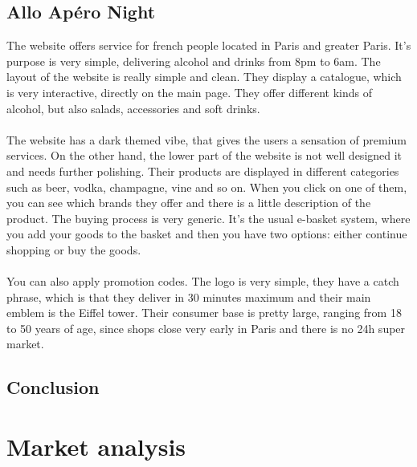 \documentclass[12p]{article}
\begin{document}
\subsection{Allo Apéro Night \cite{alloAperoNight}}
The website offers service for french people located in Paris and greater Paris.
It’s purpose is very simple, delivering alcohol and drinks from 8pm to 6am.
The layout of the website is really simple and clean. They display a catalogue, which is very interactive, directly on the main page. They offer different kinds of alcohol, but also salads, accessories and soft drinks. 
\\ \\
The website has a dark themed vibe, that gives the users a sensation of premium services.
On the other hand, the lower part of the website is not well designed it and needs further polishing.
Their products are displayed in different categories such as beer, vodka, champagne, vine and so on.
When you click on one of them, you can see which brands they offer and there is a little description of the product.
The buying process is very generic. It’s the usual e-basket system, where you add your goods to the basket and then you have two options: either continue shopping or buy the goods.
\\ \\
You can also apply promotion codes.
The logo is very  simple, they have a catch phrase, which is that they deliver in 30 minutes maximum and their main emblem is the Eiffel tower.
Their consumer base is pretty large, ranging from 18 to 50 years of age, since shops close very early in Paris and there is no 24h super market.


\subsection{Conclusion}


\newpage
\section{Market analysis} \label{MarketAnalysis}

\end{document}
